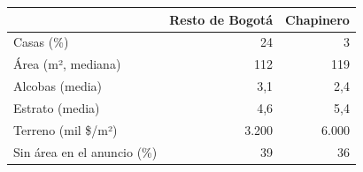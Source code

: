 \begin{tabular}{lrr}
\toprule
 & Resto de Bogotá & Chapinero \\
\midrule
Casas (\%) & 24 & 3 \\
Área (m², mediana) & 112 & 119 \\
Alcobas (media) & 3,1 & 2,4 \\
Estrato (media) & 4,6 & 5,4 \\
Terreno (mil \$/m²) & 3.200 & 6.000 \\
Sin área en el anuncio (\%) & 39 & 36 \\
\bottomrule
\end{tabular}

